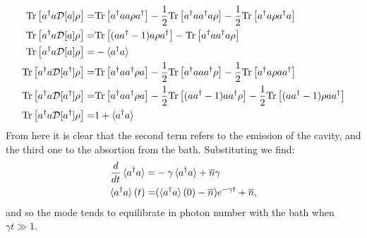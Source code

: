 \begin{align}
  \mathrm{Tr}\left[a^{\dagger}a\mathcal{D}[a]\rho\right] =& \mathrm{Tr}\left[a^{\dagger}aa\rho a^{\dagger}\right]-\frac{1}{2}\mathrm{Tr}\left[a^{\dagger}aa^{\dagger}a\rho\right]-\frac{1}{2}\mathrm{Tr}\left[a^{\dagger}a\rho a^{\dagger}a\right] \\
  \mathrm{Tr}\left[a^{\dagger}a\mathcal{D}[a]\rho\right] =& \mathrm{Tr}\left[(aa^{\dagger}-1)a\rho a^{\dagger}\right] - \mathrm{Tr}\left[a^{\dagger}aa^{\dagger}a\rho\right]\\
  \mathrm{Tr}\left[a^{\dagger}a\mathcal{D}[a]\rho\right] =&-\braket{a^{\dagger}a}\\
\mathrm{Tr}\left[a^{\dagger}a\mathcal{D}[a^{\dagger}]\rho\right] =& \mathrm{Tr}\left[a^{\dagger}aa^{\dagger}\rho a\right] - \frac{1}{2}\mathrm{Tr}\left[a^{\dagger}aaa^{\dagger}\rho\right] - \frac{1}{2}\mathrm{Tr}\left[a^{\dagger}a\rho aa^{\dagger}\right]\\
\mathrm{Tr}\left[a^{\dagger}a\mathcal{D}[a^{\dagger}]\rho\right] =& \mathrm{Tr}\left[a^{\dagger}aa^{\dagger}\rho a\right] - \frac{1}{2}\mathrm{Tr}\left[(aa^{\dagger}-1)aa^{\dagger}\rho\right] - \frac{1}{2}\mathrm{Tr}\left[(aa^{\dagger}-1)\rho aa^{\dagger}\right]\\
\mathrm{Tr}\left[a^{\dagger}a\mathcal{D}[a^{\dagger}]\rho\right] =& 1+ \braket{a^{\dagger}a}
\end{align}
From here it is clear that the second term refers to the emission of the cavity, and the third one to the absortion from the bath. Substituting
we find:
\begin{align}
  \frac{d}{dt}\braket{a^{\dagger}a} = &-\gamma\braket{a^{\dagger}a} + \overline{n}\gamma\\
  \braket{a^{\dagger}a}(t) =& (\braket{a^{\dagger}a}(0)-\overline{n})e^{-\gamma t} + \overline{n},
\end{align}
and so the mode tends to equilibrate in photon number with the bath when $\gamma t\gg 1$.
